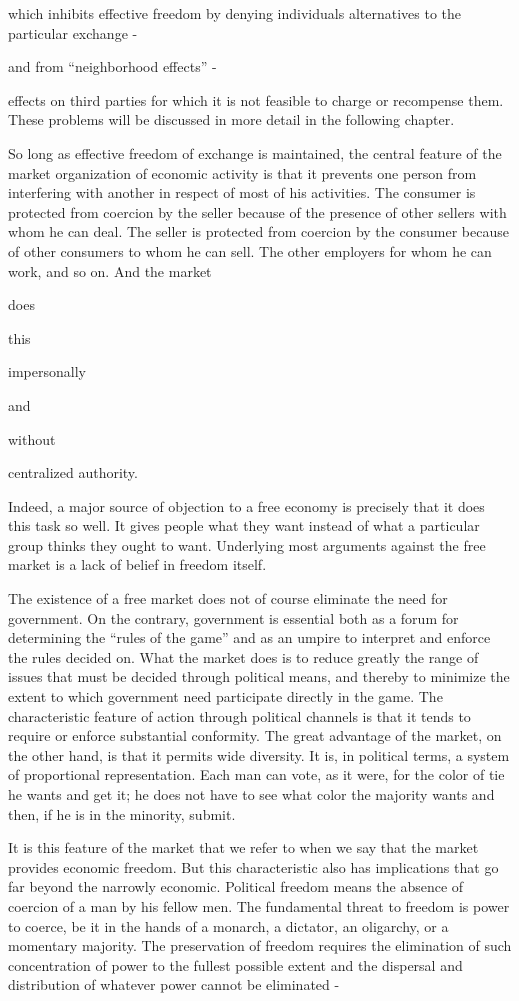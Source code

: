 \documentclass[11pt,openany]{book}
\begin{document}
which inhibits effective freedom by denying individuals alternatives to the particular exchange -

and from ``neighborhood effects'' -

effects on third parties for which it is not feasible to charge or recompense them. These problems will be discussed in more detail in the following chapter.

So long as effective freedom of exchange is maintained, the central feature of the market organization of economic activity is that it prevents one person from interfering with another in respect of most of his activities. The consumer is protected from coercion by the seller because of the presence of other sellers with whom he can deal. The seller is protected from coercion by the consumer because of other consumers to whom he can sell. The other employers for whom he can work, and so on. And the market

does

this

impersonally

and

without

centralized authority.

Indeed, a major source of objection to a free economy is precisely that it does this task so well. It gives people what they want instead of what a particular group thinks they ought to want. Underlying most arguments against the free market is a lack of belief in freedom itself.

The existence of a free market does not of course eliminate the need for government. On the contrary, government is essential both as a forum for determining the ``rules of the game'' and as an umpire to interpret and enforce the rules decided on. What the market does is to reduce greatly the range of issues that must be decided through political means, and thereby to minimize the extent to which government need participate directly in the game. The characteristic feature of action through political channels is that it tends to require or enforce substantial conformity. The great advantage of the market, on the other hand, is that it permits wide diversity. It is, in political terms, a system of proportional representation. Each man can vote, as it were, for the color of tie he wants and get it; he does not have to see what color the majority wants and then, if he is in the minority, submit.

It is this feature of the market that we refer to when we say that the market provides economic freedom. But this characteristic also has implications that go far beyond the narrowly economic. Political freedom means the absence of coercion of a man by his fellow men. The fundamental threat to freedom is power to coerce, be it in the hands of a monarch, a dictator, an oligarchy, or a momentary majority. The preservation of freedom requires the elimination of such concentration of power to the fullest possible extent and the dispersal and distribution of whatever power cannot be eliminated -
\end{document}
